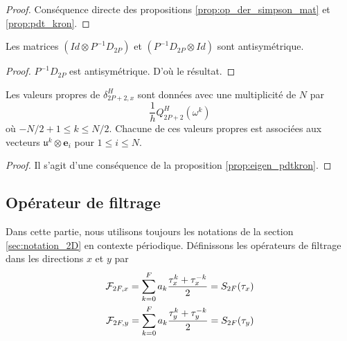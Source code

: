 \begin{proof}
Conséquence directe des propositions \ref{prop:op_der_simpson_mat} et \ref{prop:pdt_kron}.
\end{proof}

\begin{proposition}
Les matrices $(Id \otimes P^{-1}D_{2P})$ et $(P^{-1}D_{2P} \otimes Id)$ sont antisymétrique.
\end{proposition}

\begin{proof}
$P^{-1}D_{2P}$ est antisymétrique. D'où le résultat.
\end{proof}

\begin{proposition}
Les valeurs propres de $\delta_{2P+2,x}^H$ sont données avec une multiplicité de $N$ par
\begin{equation}
\dfrac{1}{h}Q_{2P+2}^H(\omega^k)
\end{equation}
où $-N/2+1 \leq k \leq N/2$. Chacune de ces valeurs propres est associées aux vecteurs $\mathfrak{u}^k \otimes \mathbf{e}_i$ pour $1 \leq i \leq N$.
\end{proposition}

\begin{proof}
Il s'agit d'une conséquence de la proposition \ref{prop:eigen_pdtkron}.
\end{proof}








\subsection{Opérateur de filtrage}

Dans cette partie, nous utilisons toujours les notations de la section \ref{sec:notation_2D} en contexte périodique. Définissons les opérateurs de filtrage dans les directions $x$ et $y$ par
\begin{eqnarray*}
\mathcal{F}_{2F,x} = \displaystyle\sum\limits_{k=0}^F a_k \dfrac{\tau_x^k + \tau_x^{-k}}{2}  = S_{2F}(\tau_x)\\
\mathcal{F}_{2F,y} = \displaystyle\sum\limits_{k=0}^F a_k \dfrac{\tau_y^k + \tau_y^{-k}}{2} = S_{2F}(\tau_y) \\
\end{eqnarray*}

